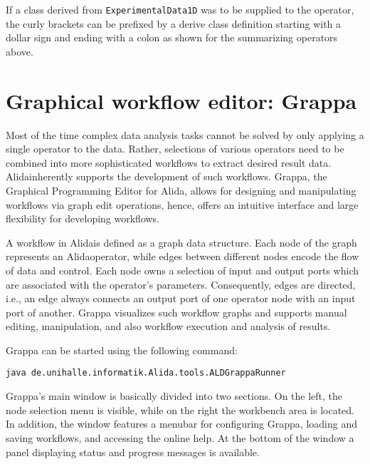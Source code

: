 If a class derived from \lstinline+ExperimentalData1D+ was to be supplied to the operator,
the curly brackets can be prefixed by a derive class definition starting with a dollar sign
and ending with a colon as shown for the summarizing operators above.


\newcommand{\alida}{Alida}
\newcommand{\grappa}{Grappa}
\newcommand{\icode}[1]{\lstinline+#1+}

\section{Graphical workflow editor: \grappa}
Most of the time complex data analysis tasks cannot be solved by only applying a
single operator to the data. Rather, selections of various operators need to be
combined into more sophisticated workflows to extract desired result data.
\alida inherently supports the development of such workflows. 
Grappa, the Graphical Programming 
Editor for Alida, allows for designing and manipulating workflows via graph edit operations, hence, offers 
an intuitive interface and large flexibility for developing workflows.

A workflow in \alida is defined as a graph data structure. Each node of the graph represents an \alida operator, while edges between 
different nodes encode the flow of data and control. Each node owns a selection of input and output ports which are associated with the
operator's parameters. Consequently, edges are directed, i.e., an edge always
connects an output port of one operator node with an input port of another. Grappa visualizes such workflow graphs and supports manual editing, manipulation, and also workflow execution
and analysis of results.

Grappa can be started using the following command:

\lstinline+java de.unihalle.informatik.Alida.tools.ALDGrappaRunner+

Grappa's main window is
basically divided into two sections. On the left, the node selection menu is
visible, while on the right the workbench area is located. 
In addition, the window features a menubar for configuring Grappa, loading and
saving workflows, and accessing the online help. At the bottom of the window a
panel displaying status and progress messages is available.

